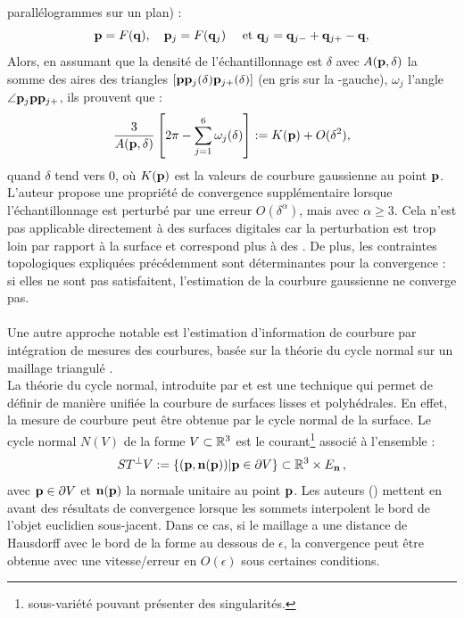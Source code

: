 parallélogrammes sur un plan) :
%
\begin{equation}
  \mathbf{p}=F(\mathbf{q}), \quad \mathbf{p}_j=F(\mathbf{q}_j) \quad \text{~et~} \mathbf{q}_j=\mathbf{q}_{j-} + \mathbf{q}_{j+} - \mathbf{q} ,
\end{equation}
%
Alors, en assumant que la densité de l’échantillonnage est $\delta$ avec $A(\mathbf{p}, \delta)$ la somme des aires des triangles
$[\mathbf{p}\mathbf{p}_j(\delta)\mathbf{p}_{j+}(\delta)]$ (en gris sur la
-gauche), $\omega_j$ l'angle $\angle
\mathbf{p}_j\mathbf{p}\mathbf{p}_{j+}$, ils prouvent que :
%
\begin{equation}
  \frac{3}{A(\mathbf{p},\delta)} \left[ 2\pi - \sum \limits^6_{j=1} \omega_j(\delta) \right] := K(\mathbf{p}) + O(\delta^2) ,
\end{equation}
%
quand $\delta$ tend vers $0$, où $K(\mathbf{p})$ est la valeurs de courbure
gaussienne au point $\mathbf{p}$.
%
\\
%
L'auteur propose une propriété de convergence supplémentaire lorsque
l'échantillonnage est perturbé par une erreur $O(\delta^\alpha)$, mais avec
$\alpha \ge 3$. Cela n'est pas applicable directement à des surfaces digitales car la perturbation est trop loin par rapport à la surface et correspond plus à des . De plus, les contraintes topologiques expliquées précédemment sont déterminantes pour la convergence : si elles ne sont pas satisfaitent, l'estimation de la courbure gaussienne ne converge pas.
%
\paragraph{}
%
Une autre approche notable est l'estimation d'information de courbure par
intégration de mesures des courbures, basée sur la théorie du cycle normal sur
un maillage triangulé \cite{CohenSteiner2003,CohenSteiner2006}.
%
\\
%
La théorie du cycle normal, introduite par  et
 est une technique qui permet de définir de manière
unifiée la courbure de surfaces lisses et polyhédrales. En effet, la mesure de
courbure peut être obtenue par le cycle normal de la surface. Le cycle normal
$N(V)$ de la forme $V \subset \mathbb{R}^3$ est le courant\footnote{sous-variété pouvant
présenter des singularités.} associé à l'ensemble :
%
\begin{equation}
  ST^\bot V := \{(\mathbf{p}, \mathbf{n}(\mathbf{p})) | \mathbf{p} \in \partial V\} \subset \mathbb{R}^3 \times E_{\mathbf{n}} \,,
\end{equation}
%
avec $\mathbf{p} \in \partial V$ et $\mathbf{n}(\mathbf{p})$ la normale unitaire au point
$\mathbf{p}$.
%
%
Les auteurs () mettent en avant des résultats de
convergence lorsque les sommets interpolent le bord de l'objet euclidien
sous-jacent. Dans ce cas, si le maillage a une distance de Hausdorff avec le
bord de la forme au dessous de $\epsilon$, la convergence peut être obtenue avec
une vitesse/erreur en $O(\epsilon)$ sous certaines conditions.
%
